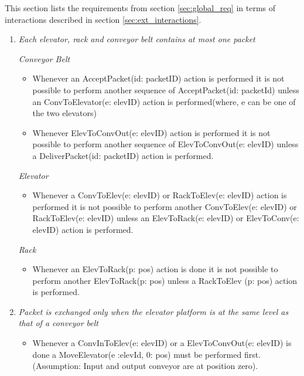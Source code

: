 
This section lists the requirements from section \ref{sec:global_req} in terms of interactions described in section \ref{sec:ext_interactions}.

\begin{enumerate}
\item \textit{Each elevator, rack and conveyor belt contains at most one packet}

	\textit{Conveyor Belt}
	\begin{itemize}
	\item
	Whenever an AcceptPacket(id: packetID) action is performed it
	is not possible to perform another sequence of AcceptPacket(id:
	packetId) unless an ConvToElevator(e: elevID) action is
	performed(where, e can be one of the two elevators)
	\item Whenever ElevToConvOut(e: elevID) action is performed it is
	not possible to perform another sequence of ElevToConvOut(e: 
	elevID)   unless a DeliverPacket(id: packetID) action is performed.
	\end{itemize}
	\textit{Elevator}
	\begin{itemize}
	\item Whenever a ConvToElev(e: elevID) or RackToElev(e: elevID) 
	action is performed it is not possible to perform another
	ConvToElev(e: elevID) or RackToElev(e: elevID) unless an 
	ElevToRack(e: elevID) or ElevToConv(e: elevID) action is performed.
	\end{itemize}
	
	\textit{Rack}
	\begin{itemize}
	\item Whenever an ElevToRack(p: pos) action is done it is not
	possible to perform another ElevToRack(p: pos) unless a RackToElev 
	(p: pos) action is performed.
	\end{itemize}

\item \textit{ Packet is exchanged only when the elevator platform is at
the same level as that of a conveyor belt}
	\begin{itemize}
	\item Whenever a ConvInToElev(e: elevID) or a ElevToConvOut(e: 
	elevID) is done a MoveElevator(e :elevId, 0: pos) must be
	performed first.(Assumption: Input and output conveyor are at
	position zero).	
	\end{itemize}


\end{enumerate}
